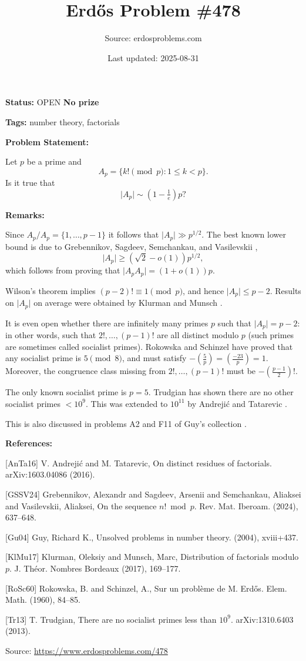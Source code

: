 \documentclass{article}
\title{Erd\H{o}s Problem \#478}
\date{Last updated: 2025-08-31}
\author{Source: erdosproblems.com}
\begin{document}
\maketitle

\noindent\textbf{Status:} OPEN \quad \textbf{No prize}

\noindent\textbf{Tags:} number theory, factorials

\medskip
\noindent\textbf{Problem Statement:}

Let $p$ be a prime and\[A_p = \{ k! \pmod{p} : 1\leq k<p\}.\]Is it true that\[\lvert A_p\rvert \sim (1-\tfrac{1}{e})p?\]

\bigskip
\noindent\textbf{Remarks:}

Since $A_p/A_p=\{1,\ldots,p-1\}$ it follows that $\lvert A_p\rvert \gg p^{1/2}$. The best known lower bound is due to Grebennikov, Sagdeev, Semchankau, and Vasilevskii \cite{GSSV24},\[\lvert A_p\rvert \geq (\sqrt{2}-o(1))p^{1/2},\]which follows from proving that $\lvert A_pA_p\rvert=(1+o(1))p$.

Wilson's theorem implies $(p-2)!\equiv 1\pmod{p}$, and hence $\lvert A_p\rvert\leq p-2$. Results on $\lvert A_p\rvert$ on average were obtained by Klurman and Munsch \cite{KlMu17}. 

It is even open whether there are infinitely many primes $p$ such that $\lvert A_p\rvert=p-2$: in other words, such that $2!,\ldots,(p-1)!$ are all distinct modulo $p$ (such primes are sometimes called socialist primes). Rokowska and Schinzel \cite{RoSc60} have proved that any socialist prime is $5\pmod{8}$, and must satisfy $-(\frac{5}{p})=(\frac{-23}{p})=1$. Moreover, the congruence class missing from $2!,\ldots,(p-1)!$ must be $-(\frac{p-1}{2})!$. 

The only known socialist prime is $p=5$. Trudgian \cite{Tr13} has shown there are no other socialist primes $<10^9$. This was extended to $10^{11}$ by Andreji\'{c} and Tatarevic \cite{AnTa16}.

This is also discussed in problems A2 and F11 of Guy's collection \cite{Gu04}.

\bigskip
\noindent\textbf{References:}

[AnTa16] V. Andreji\'{c} and M. Tatarevic, On distinct residues of factorials. arXiv:1603.04086 (2016).
 
 [GSSV24] Grebennikov, Alexandr and Sagdeev, Arsenii and Semchankau,
Aliaksei and Vasilevskii, Aliaksei, On the sequence {$n! \bmod p$}. Rev. Mat. Iberoam. (2024), 637--648.
 
 [Gu04] Guy, Richard K., Unsolved problems in number theory. (2004), xviii+437.
 
 [KlMu17] Klurman, Oleksiy and Munsch, Marc, Distribution of factorials modulo {$p$}. J. Th\'{e}or. Nombres Bordeaux (2017), 169--177.
 
 [RoSc60] Rokowska, B. and Schinzel, A., Sur un probl\`eme de {M}. {E}rd\H os. Elem. Math. (1960), 84--85.
 
 [Tr13] T. Trudgian, There are no socialist primes less than $10^9$. arXiv:1310.6403 (2013).

\bigskip
\noindent\small{Source: \url{https://www.erdosproblems.com/478}}
\end{document}
